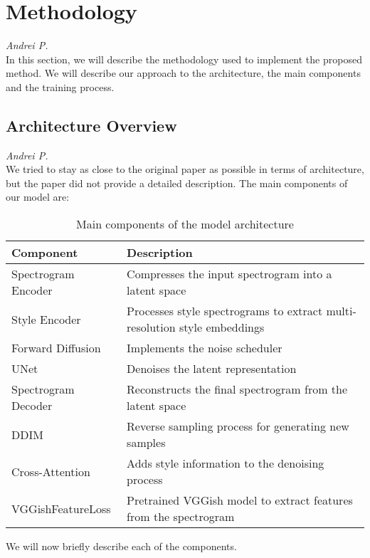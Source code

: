 \section{Methodology}
\textit{Andrei P.}\\
In this section, we will describe the methodology used to implement the proposed method. We will describe our approach to the architecture, the main components and the training process.

\subsection{Architecture Overview}
\textit{Andrei P.}\\
We tried to stay as close to the original paper as possible in terms of architecture, but the paper did not provide a detailed description. The main components of our model are:

\begin{table}[h]
\centering
\begin{tabular}{|l|p{10cm}|}
\hline
\textbf{Component} & \textbf{Description} \\
\hline
Spectrogram Encoder & Compresses the input spectrogram into a latent space \\
\hline
Style Encoder & Processes style spectrograms to extract multi-resolution style embeddings \\
\hline
Forward Diffusion & Implements the noise scheduler \\
\hline
UNet & Denoises the latent representation \\
\hline
Spectrogram Decoder & Reconstructs the final spectrogram from the latent space \\
\hline
DDIM & Reverse sampling process for generating new samples \\
\hline
Cross-Attention & Adds style information to the denoising process \\
\hline
VGGishFeatureLoss & Pretrained VGGish model to extract features from the spectrogram \\
\hline
\end{tabular}
\caption{Main components of the model architecture}
\label{tab:model-components}
\end{table}

\noindent We will now briefly describe each of the components.

